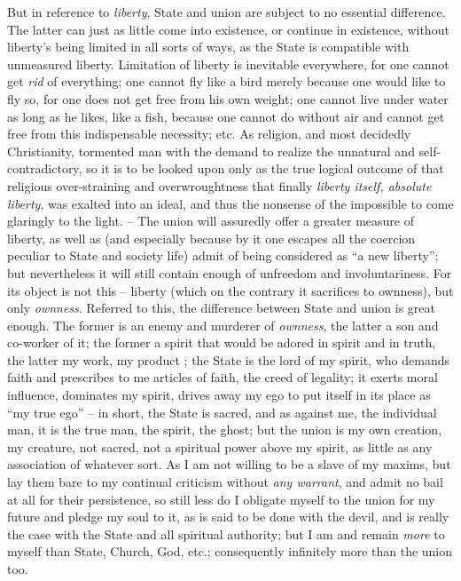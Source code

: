  But in reference to \textit{liberty}, State and union are subject to no 
essential difference. The latter can just as little come into existence, or 
continue in existence, without liberty's being limited in all sorts of ways, 
as the State is compatible with unmeasured liberty. Limitation of liberty is 
inevitable everywhere, for one cannot get \textit{rid} of everything; one 
cannot fly like a bird merely because one would like to fly so, for one does 
not get free from his own weight; one cannot live under water as long as he 
likes, like a fish, because one cannot do without air and cannot get free from 
this indispensable necessity; etc. As religion, and most decidedly 
Christianity, tormented man with the demand to realize the unnatural and self- 
contradictory, so it is to be looked upon only as the true logical outcome of 
that religious over-straining and overwroughtness that finally \textit{liberty 
itself, absolute liberty}, was exalted into an ideal, and thus the nonsense of 
the impossible to come glaringly to the light. -- The union will assuredly 
offer a greater measure of liberty, as well as (and especially because by it 
one escapes all the coercion peculiar to State and society life) admit of 
being considered as ``a new liberty''; but nevertheless it will still 
contain enough of unfreedom and involuntariness. For its object is not this -- 
liberty (which on the contrary it sacrifices to ownness), but only 
\textit{ownness}. Referred to this, the difference between State and union is 
great enough. The former is an enemy and murderer of \textit{ownness}, the 
latter a son and co-worker of it; the former a spirit that would be adored in 
spirit and in truth, the latter my work, my product ; the State is the lord of 
my spirit, who demands faith and prescribes to me articles of faith, the creed 
of legality; it exerts moral influence, dominates my spirit, drives away my 
ego to put itself in its place as ``my true ego'' -- in short, the State is 
sacred, and as against me, the individual man, it is the true man, the spirit, 
the ghost; but the union is my own creation, my creature, not sacred, not a 
spiritual power above my spirit, as little as any association of whatever 
sort. As I am not willing to be a slave of my maxims, but lay them bare to my 
continual criticism without \textit{any warrant}, and admit no bail at all for 
their persistence, so still less do I obligate myself to the union for my 
future and pledge my soul to it, as is said to be done with the devil, and is 
really the case with the State and all spiritual authority; but I am and 
remain \textit{more} to myself than State, Church, God, etc.; consequently 
infinitely more than the union too.

